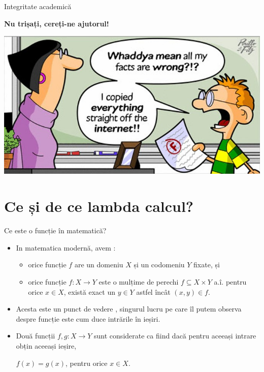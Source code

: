 \documentclass[xcolor=pdftex,romanian,colorlinks]{beamer}
\begin{document}
\begin{frame}{Integritate academică}

\begin{center}
{\Large \alert{\textbf{Nu trișați, cereți-ne ajutorul!}}}


\bigskip
\includegraphics[scale=.4]{images/Dishonesty.jpg}
\end{center}

\end{frame}

\section{\color{section-color} Ce și de ce lambda calcul?}


\begin{frame}{Ce este o funcție în matematică?}

\begin{itemize}
\item In matematica modernă, avem :
\begin{itemize}
	\item orice funcție $f$ are un \alert{domeniu $X$} și un \alert{codomeniu $Y$} fixate, și
	\item orice funcție $f : X \to Y$ este o \alert{mulțime de perechi $f \subseteq X \times Y$} a.î. pentru orice $x \in X$, există exact un $y \in Y$ astfel încât $(x,y)\in f$. 
\end{itemize}

\medskip
\item Acesta este un punct de vedere ,  singurul lucru pe care îl putem observa despre funcție este cum duce intrările în ieșiri.

\medskip
\item Două funcții $f,g : X \to Y$ sunt considerate ca fiind  dacă pentru aceeași intrare obțin aceeași ieșire,
\begin{center}
$f(x) = g(x)$, pentru orice $x \in X$.
\end{center}
\end{itemize}
\end{frame}
\end{document}
